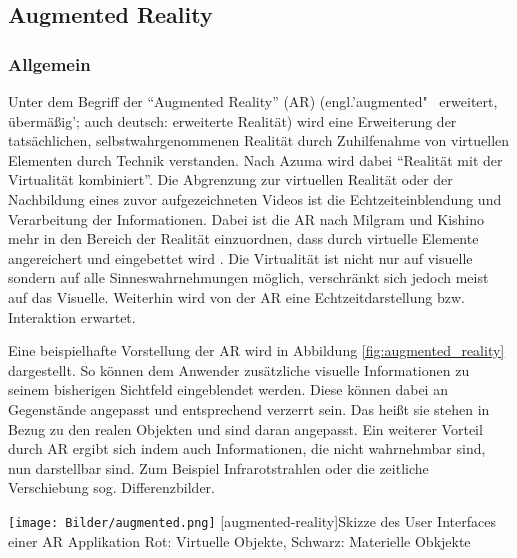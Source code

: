 \documentclass[12pt,a4paper,bibliography=totocnumbered,listof=totocnumbered]{scrartcl}
\begin{document}
\subsection{Augmented Reality}
\subsubsection{Allgemein}
Unter dem Begriff der “Augmented Reality” (\ac{AR}) (engl.'augmented"~ erweitert, übermäßig'; auch deutsch: erweiterte Realität) wird eine Erweiterung der tatsächlichen, selbstwahrgenommenen Realität durch Zuhilfenahme von virtuellen Elementen durch Technik verstanden. Nach Azuma wird dabei “Realität mit der Virtualität kombiniert”. Die Abgrenzung zur virtuellen Realität oder der Nachbildung eines zuvor aufgezeichneten Videos ist die Echtzeiteinblendung und Verarbeitung der Informationen. Dabei ist die AR nach Milgram und Kishino mehr in den Bereich der Realität einzuordnen, dass durch virtuelle Elemente angereichert und eingebettet wird \cite{Tonnis:2010aa}. Die Virtualität ist nicht nur auf visuelle sondern auf alle Sinneswahrnehmungen möglich, verschränkt sich jedoch meist auf das Visuelle. Weiterhin wird von der AR eine Echtzeitdarstellung bzw. Interaktion erwartet. 

Eine beispielhafte Vorstellung der AR wird in Abbildung \ref{fig:augmented_reality} dargestellt. So können dem Anwender zusätzliche visuelle Informationen zu seinem bisherigen Sichtfeld eingeblendet werden. Diese können dabei an Gegenstände angepasst und entsprechend verzerrt sein. Das heißt sie stehen in Bezug zu den realen Objekten und sind daran angepasst. 
Ein weiterer Vorteil durch AR ergibt sich indem auch Informationen, die nicht wahrnehmbar sind, nun darstellbar sind. Zum Beispiel Infrarotstrahlen oder die zeitliche Verschiebung sog. Differenzbilder.
	
\begin{minipage}{\linewidth}
\vspace{1em}
	\centering
	\texttt{[image: Bilder/augmented.png]}
	[augmented-reality]{Skizze des User Interfaces einer AR Applikation\newline
	Rot: Virtuelle Objekte, Schwarz: Materielle Obkjekte}
	\label{fig:augmented_reality}
\vspace{1em}
\end{minipage}
\end{document}
